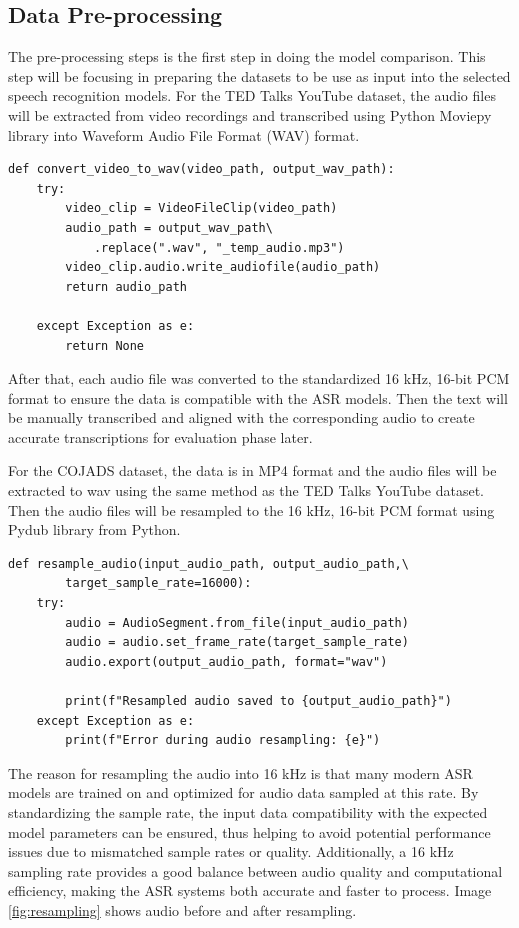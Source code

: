 \subsection{Data Pre-processing}
The pre-processing steps is the first step in doing the model comparison. This step will be focusing in preparing the datasets to be use as input into the selected speech recognition models. For the TED Talks YouTube dataset, the audio files will be extracted from video recordings and transcribed using Python Moviepy library into Waveform Audio File Format (WAV) format.
\begin{lstlisting}[caption={Python code to convert video to WAV format using moviepy}]
    def convert_video_to_wav(video_path, output_wav_path):
    try:
        video_clip = VideoFileClip(video_path)
        audio_path = output_wav_path\
            .replace(".wav", "_temp_audio.mp3")
        video_clip.audio.write_audiofile(audio_path)
        return audio_path
    
    except Exception as e:
        return None
\end{lstlisting}
After that, each audio file was converted to the standardized 16 kHz, 16-bit PCM format to ensure the data is compatible with the ASR models. Then the text will be manually transcribed and aligned with the corresponding audio to create accurate transcriptions for evaluation phase later.

For the COJADS dataset, the data is in MP4 format and the audio files will be extracted to wav using the same method as the TED Talks YouTube dataset. Then the audio files will be resampled to the 16 kHz, 16-bit PCM format using Pydub library from Python.

\begin{lstlisting}[caption={Python code to resample audio to 16 kHz using pydub}]
    def resample_audio(input_audio_path, output_audio_path,\
        target_sample_rate=16000):
    try:
        audio = AudioSegment.from_file(input_audio_path)
        audio = audio.set_frame_rate(target_sample_rate)
        audio.export(output_audio_path, format="wav")
        
        print(f"Resampled audio saved to {output_audio_path}")
    except Exception as e:
        print(f"Error during audio resampling: {e}")
\end{lstlisting}
The reason for resampling the audio into 16 kHz is that many modern ASR models are trained on and optimized for audio data sampled at this rate. By standardizing the sample rate, the input data compatibility with the expected model parameters can be ensured, thus helping to avoid potential performance issues due to mismatched sample rates or quality. Additionally, a 16 kHz sampling rate provides a good balance between audio quality and computational efficiency, making the ASR systems both accurate and faster to process. Image \ref{fig:resampling} shows audio before and after resampling.


